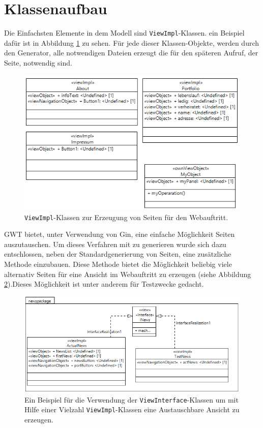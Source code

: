 \newpage
\section{Klassenaufbau}
Die Einfachsten Elemente in dem Modell sind \texttt{ViewImpl}-Klassen. ein
Beispiel dafür ist in Abbildung \ref{Fig:viewimpl} zu sehen. Für jede dieser
Klassen-Objekte, werden durch den Generator, alle notwendigen Dateien erzeugt
die für den späteren Aufruf, der Seite, notwendig sind.

\begin{figure}[htbp]
\begin{center}
\includegraphics[width=1.0\textwidth]{./img/GWT-Model-Views-alg.png}
\caption{\texttt{ViewImpl}-Klassen zur Erzeugung von Seiten
für den Webauftritt.}\label{Fig:viewimpl}
\end{center}
\end{figure}

GWT bietet, unter Verwendung von Gin, eine einfache Möglichkeit Seiten
auszutauschen. Um dieses Verfahren mit zu generieren wurde sich dazu
entschlossen, neben der Standardgenerierung von Seiten, eine zusätzliche
Methode einzubauen. Diese Methode bietet die Möglichkeit beliebig viele
alternativ Seiten für eine Ansicht im Webauftritt zu erzeugen (siehe Abbildung
\ref{Fig:viewInterface}).Dieses Möglichkeit ist unter anderem für Testzwecke
gedacht.

\begin{figure}[htbp]
\begin{center}
\includegraphics[width=1.0\textwidth]{./img/GWT-Model-Views-interface.png}
\caption{Ein Beispiel für die Verwendung der \texttt{ViewInterface}-Klassen
um mit Hilfe einer Vielzahl \texttt{ViewImpl}-Klassen
eine Austauschbare Ansicht zu erzeugen.}\label{Fig:viewInterface}
\end{center}
\end{figure} 

